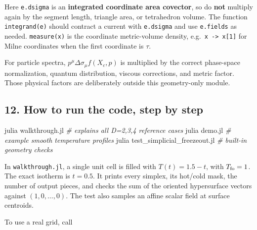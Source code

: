 \documentclass[
  10pt,
]{article}
\newenvironment{Shaded}{\begin{snugshade}}{\end{snugshade}}
\newcommand{\CommentTok}[1]{\textcolor[rgb]{0.56,0.35,0.01}{\textit{#1}}}
\newcommand{\ExtensionTok}[1]{#1}
\newcommand{\NormalTok}[1]{#1}
\begin{document}
Here \texttt{e.dsigma} is an \textbf{integrated coordinate area
covector}, so do \textbf{not} multiply again by the segment length,
triangle area, or tetrahedron volume. The function \texttt{integrand(e)}
should contract a current with \texttt{e.dsigma} and use
\texttt{e.fields} as needed. \texttt{measure(x)} is the coordinate
metric-volume density, e.g.~\texttt{x\ -\textgreater{}\ x{[}1{]}} for
Milne coordinates when the first coordinate is \(\tau\).

For particle spectra, \(p^\mu\Delta\sigma_\mu f(X_c,p)\) is multiplied
by the correct phase-space normalization, quantum distribution, viscous
corrections, and metric factor. Those physical factors are deliberately
outside this geometry-only module.

\subsection{12. How to run the code, step by
step}\label{how-to-run-the-code-step-by-step}

\begin{Shaded}
\begin{Highlighting}[]
\ExtensionTok{julia}\NormalTok{ walkthrough.jl                 }\CommentTok{\# explains all D=2,3,4 reference cases}
\ExtensionTok{julia}\NormalTok{ demo.jl                        }\CommentTok{\# example smooth temperature profiles}
\ExtensionTok{julia}\NormalTok{ test\_simplicial\_freezeout.jl   }\CommentTok{\# built{-}in geometry checks}
\end{Highlighting}
\end{Shaded}

In \texttt{walkthrough.jl}, a single unit cell is filled with
\(T(t)=1.5-t\), with \(T_{\rm fo}=1\). The exact isotherm is \(t=0.5\).
It prints every simplex, its hot/cold mask, the number of output pieces,
and checks the sum of the oriented hypersurface vectors against
\((1,0,\ldots,0)\). The test also samples an affine scalar field at
surface centroids.

To use a real grid, call
\end{document}
